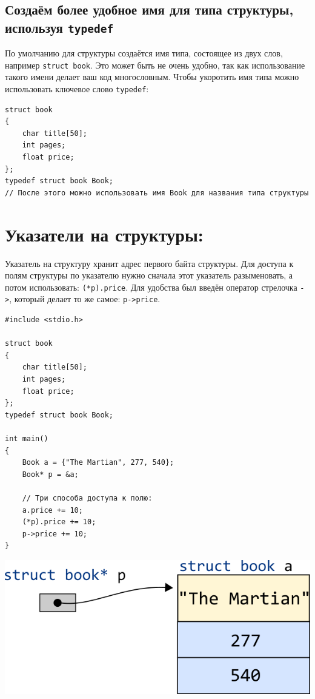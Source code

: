 \documentclass[10pt]{article}
\begin{document}
\subsection*{Создаём более удобное имя для типа структуры, используя \texttt{typedef}}
По умолчанию для структуры создаётся имя типа, состоящее из двух слов, например \texttt{struct book}. Это может быть не очень удобно, так как использование такого имени делает ваш код многословным. Чтобы укоротить имя типа можно использовать ключевое слово \texttt{typedef}:
\begin{lstlisting}
struct book 
{
    char title[50];
    int pages;
    float price;
};
typedef struct book Book;
// После этого можно использовать имя Book для названия типа структуры
\end{lstlisting}


\newpage
\section*{Указатели на структуры:}
Указатель на структуру хранит адрес первого байта структуры. Для доступа к полям структуры по указателю нужно сначала этот указатель разыменовать, а потом использовать: \texttt{(*p).price}. Для удобства был введён оператор стрелочка \texttt{->}, который делает то же самое: \texttt{p->price}.
\begin{multicols}{2}
\begin{lstlisting}
#include <stdio.h>

struct book 
{
    char title[50];
    int pages;
    float price;
};
typedef struct book Book;

int main() 
{
    Book a = {"The Martian", 277, 540};
    Book* p = &a;
    
    // Три способа доступа к полю:
    a.price += 10;
    (*p).price += 10;
    p->price += 10;
}
\end{lstlisting}
\vfill\null
\columnbreak
\vspace*{3\baselineskip}
\begin{center}
\includegraphics[scale=0.5]{../images/structpointer2.png}
\end{center}
\end{multicols}
\end{document}
